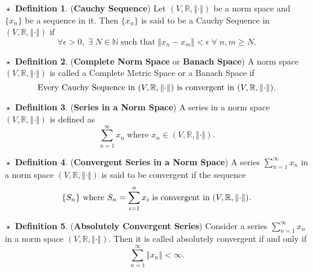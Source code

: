 \documentclass{article}
\theoremstyle{definition}
\newtheorem{definition}{$\boxed{\star}$ Definition}
\theoremstyle{remark}
\theoremstyle{definition}
\theoremstyle{definition}
\theoremstyle{definition}
\newcommand{\norm}[1]{\left \Vert #1 \right \Vert}
\newcommand{\R}{\mathbb{R}}
\newcommand{\N}{\mathbb{N}}
\begin{document}
\begin{definition}
	(\textbf{Cauchy Sequence}) Let $ (V,\R,\norm{\cdot}) $ be a norm space and $ \{x_n\} $ be a sequence in it. Then $ \{x_n\} $ is said to be a Cauchy Sequence in $ (V,\R,\norm{\cdot}) $ if
	\[\forall \epsilon > 0, \;\exists \; N\in \N \;\text{such that}\; \norm{x_n - x_m} < \epsilon\;\forall \;n,m \ge N.\]
\end{definition}
\hrulefill
\begin{definition}
	(\textbf{Complete Norm Space} or \textbf{Banach Space}) A norm space $ (V,\R,\norm{\cdot}) $ is called a Complete Metric Space or a Banach Space if 
	\[\text{Every Cauchy Sequence in $ (V,\R,\norm{\cdot}) $ is convergent in $ (V,\R,\norm{\cdot}) $.}\]
\end{definition}
\hrulefill
\begin{definition}
	(\textbf{Series in a Norm Space}) A series in a norm space $ (V,\R,\norm{\cdot}) $ is defined as 
	\[\sum_{n=1}^{\infty} x_n\;\text{where }x_n \in (V,\R,\norm{\cdot}).\]
\end{definition}
\hrulefill
\begin{definition}
	(\textbf{Convergent Series in a Norm Space}) A series $ \sum_{n=1}^{\infty} x_n$ in a norm space $ (V,\R,\norm{\cdot}) $ is said to be convergent if the sequence 
	\[\{S_n\} \text{ where }S_n = \sum_{i=1}^{n} x_i\text{ is convergent in $ (V,\R,\norm{\cdot}) $.}\]
\end{definition}
\hrulefill
\begin{definition}
	(\textbf{Absolutely Convergent Series}) Consider a series $ \sum_{n=1}^{\infty}x_n $ in a norm space $ (V,\R,\norm{\cdot}) $. Then it is called absolutely convergent if and only if
	\[\sum_{n=1}^{\infty} \norm{x_n} < \infty.\]
\end{definition}
\hrulefill
\end{document}
